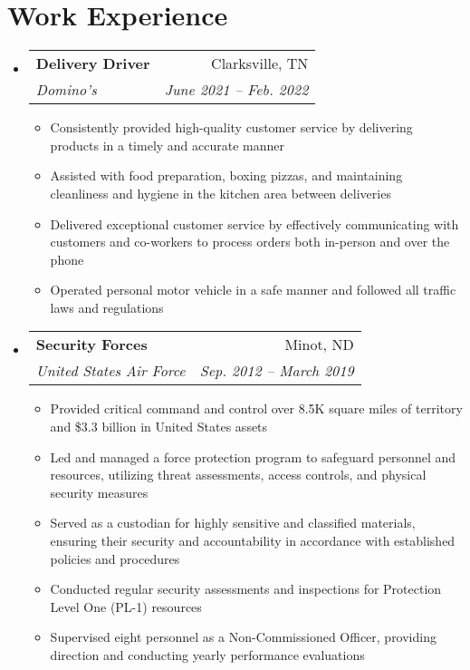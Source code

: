 \documentclass[letterpaper,11pt]{article}
\makeatletter
\newcommand{\resumeItem}[1]{
  \item\small{
    {#1 \vspace{-2pt}}
  }
}
\newcommand{\resumeSubheading}[4]{
  \vspace{-2pt}\item
    \begin{tabular*}{0.97\textwidth}[t]{l@{\extracolsep{\fill}}r}
      \textbf{#1} & #2 \\
      \textit{\small#3} & \textit{\small #4} \\
    \end{tabular*}\vspace{-7pt}
}
\newcommand{\resumeSubSubheading}[2]{
    \item
    \begin{tabular*}{0.97\textwidth}{l@{\extracolsep{\fill}}r}
      \textit{\small#1} & \textit{\small #2} \\
    \end{tabular*}\vspace{-7pt}
}
\newcommand{\resumeSubHeadingListStart}{\begin{itemize}[leftmargin=0.15in, label={}]}
\newcommand{\resumeSubHeadingListEnd}{\end{itemize}}
\newcommand{\resumeItemListStart}{\begin{itemize}}
\newcommand{\resumeItemListEnd}{\end{itemize}\vspace{-5pt}}
\makeatother
\begin{document}
\section{Work Experience}
  \resumeSubHeadingListStart

    \resumeSubheading
      {Delivery Driver}{Clarksville, TN}
      {Domino's}{June 2021 -- Feb. 2022}
      \resumeItemListStart
        \resumeItem{Consistently provided high-quality customer service by delivering products in a timely and accurate manner}
        \resumeItem{Assisted with food preparation, boxing pizzas, and maintaining cleanliness and hygiene in the kitchen area between deliveries}
        \resumeItem{Delivered exceptional customer service by effectively communicating with customers and co-workers to process orders both in-person and over the phone}
				\resumeItem{Operated personal motor vehicle in a safe manner and followed all traffic laws and regulations}
      \resumeItemListEnd
      

    \resumeSubheading
      {Security Forces}{Minot, ND}
      {United States Air Force}{Sep. 2012 -- March 2019}
      \resumeItemListStart
        \resumeItem{Provided critical command and control over 8.5K square miles of territory and \$3.3 billion in United States assets}
        \resumeItem{Led and managed a force protection program to safeguard personnel and resources, utilizing threat assessments, access controls, and physical security measures}
        \resumeItem{Served as a custodian for highly sensitive and classified materials, ensuring their security and accountability in accordance with established policies and procedures}
				\resumeItem{Conducted regular security assessments and inspections for Protection Level One (PL-1) resources}
				\resumeItem{Supervised eight personnel as a Non-Commissioned Officer, providing direction and conducting yearly performance evaluations}
    \resumeItemListEnd

  \resumeSubHeadingListEnd


 


\end{document}
